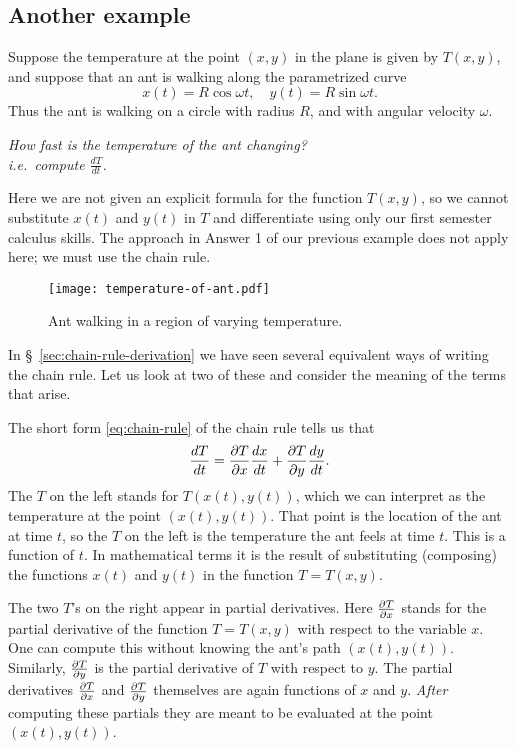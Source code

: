 \subsection{Another example} 
Suppose the temperature at the point $(x,y)$ in the plane is given by $T(x, y)$,
and suppose that an ant is walking along the parametrized curve
\[
x(t) = R\cos \omega t, \quad y(t) = R\sin \omega t.
\]
Thus the ant is walking on a circle with radius $R$, and with angular velocity
$\omega$.
\begin{center}\itshape
  How fast is the temperature of the ant changing?\\
  i.e.~compute $\frac{dT}{dt}$.
\end{center}
Here we are not given an explicit formula for the function $T(x,y)$, so we
cannot substitute $x(t)$ and $y(t)$ in $T$ and differentiate using only our
first semester calculus skills.  The approach in Answer 1 of our previous
example does not apply here; we must use the chain rule.

\begin{figure}[h]
  \texttt{[image: temperature-of-ant.pdf]}
  \caption{Ant walking in a region of varying temperature.}
  \label{fig:temperature-of-ant}
\end{figure}
In \S~\ref{sec:chain-rule-derivation} we have seen several equivalent ways of
writing the chain rule.  Let us look at two of these and consider the meaning of
the terms that arise.

The short form \eqref{eq:chain-rule} of the chain rule tells us that
\[
\frac{dT}{dt} = \frac{\partial T}{\partial x} \frac{dx}{dt} + \frac{\partial T}{\partial y} \frac{dy}{dt}.
\]
The $T$ on the left stands for $T(x(t), y(t))$, which we can interpret as the
temperature at the point $(x(t), y(t))$.  That point is the location of the ant
at time $t$, so the $T$ on the left is the temperature the ant feels at time
$t$.  This is a function of $t$.  In mathematical terms it is the result of
substituting (composing) the functions $x(t)$ and $y(t)$ in the function
$T=T(x,y)$.

The two $T$'s on the right appear in partial derivatives.  Here $\frac{\partial T}{\partial x}$ stands
for the partial derivative of the function $T=T(x, y)$ with respect to the
variable $x$.  One can compute this without knowing the ant's path $(x(t),
y(t))$.  Similarly, $\frac{\partial T}{\partial y}$ is the partial derivative of $T$ with respect to
$y$.  The partial derivatives $\frac{\partial T}{\partial x}$ and $\frac{\partial T}{\partial y}$ themselves are again
functions of $x$ and $y$.  \textit{After} computing these partials they are
meant to be evaluated at the point $(x(t), y(t))$.

